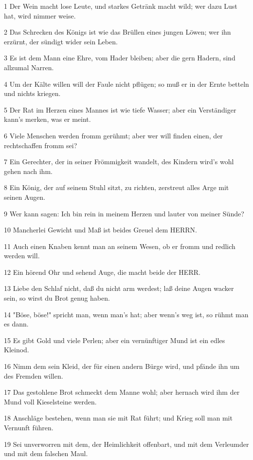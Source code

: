 \par 1 Der Wein macht lose Leute, und starkes Getränk macht wild; wer dazu Lust hat, wird nimmer weise.
\par 2 Das Schrecken des Königs ist wie das Brüllen eines jungen Löwen; wer ihn erzürnt, der sündigt wider sein Leben.
\par 3 Es ist dem Mann eine Ehre, vom Hader bleiben; aber die gern Hadern, sind allzumal Narren.
\par 4 Um der Kälte willen will der Faule nicht pflügen; so muß er in der Ernte betteln und nichts kriegen.
\par 5 Der Rat im Herzen eines Mannes ist wie tiefe Wasser; aber ein Verständiger kann's merken, was er meint.
\par 6 Viele Menschen werden fromm gerühmt; aber wer will finden einen, der rechtschaffen fromm sei?
\par 7 Ein Gerechter, der in seiner Frömmigkeit wandelt, des Kindern wird's wohl gehen nach ihm.
\par 8 Ein König, der auf seinem Stuhl sitzt, zu richten, zerstreut alles Arge mit seinen Augen.
\par 9 Wer kann sagen: Ich bin rein in meinem Herzen und lauter von meiner Sünde?
\par 10 Mancherlei Gewicht und Maß ist beides Greuel dem HERRN.
\par 11 Auch einen Knaben kennt man an seinem Wesen, ob er fromm und redlich werden will.
\par 12 Ein hörend Ohr und sehend Auge, die macht beide der HERR.
\par 13 Liebe den Schlaf nicht, daß du nicht arm werdest; laß deine Augen wacker sein, so wirst du Brot genug haben.
\par 14 "Böse, böse!" spricht man, wenn man's hat; aber wenn's weg ist, so rühmt man es dann.
\par 15 Es gibt Gold und viele Perlen; aber ein vernünftiger Mund ist ein edles Kleinod.
\par 16 Nimm dem sein Kleid, der für einen andern Bürge wird, und pfände ihn um des Fremden willen.
\par 17 Das gestohlene Brot schmeckt dem Manne wohl; aber hernach wird ihm der Mund voll Kieselsteine werden.
\par 18 Anschläge bestehen, wenn man sie mit Rat führt; und Krieg soll man mit Vernunft führen.
\par 19 Sei unverworren mit dem, der Heimlichkeit offenbart, und mit dem Verleumder und mit dem falschen Maul.
